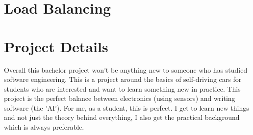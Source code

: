 \documentclass[a4paper,notitlepage]{article}
\begin{document}
\section*{Load Balancing}

\section*{Project Details}

Overall this bachelor project won't be anything new to someone who has studied software engineering. This is a project around the basics of self-driving cars for students who are interested and want to learn something new in practice. This project is the perfect balance between electronics (using sensors) and writing software (the 'AI'). For me, as a student, this is perfect. I get to learn new things and not just the theory behind everything, I also get the practical background which is always preferable.

 {}

\end{document}
